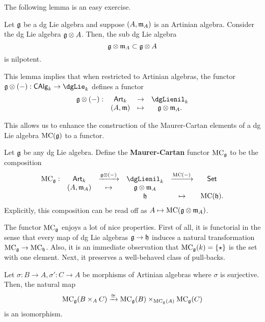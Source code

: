 \documentclass[11pt]{amsart}
\begin{document}
The following lemma is an easy exercise. 

\begin{lem}
Let $\mathfrak g$ be a dg Lie algebra and suppose $(A,{\mathfrak m}_A)$ is an Artinian algebra.
Consider the dg Lie algebra $\mathfrak g \otimes A$. 
Then, the sub dg Lie algebra
\[
\mathfrak g \otimes {\mathfrak m}_A \subset \mathfrak g \otimes A
\]
is nilpotent.
\end{lem}

This lemma implies that when restricted to Artinian algebras, the functor $\fg \tensor (-) : \CAlg_k \to \dgLie_k$ defines a functor
\[
\begin{array}{cccc}
\fg \tensor (-) : & \Art_k & \to & \dgLienil_k \\
& (A,\fm) & \mapsto & \fg \tensor \fm_A .
\end{array}
\]

This allows us to enhance the construction of the Maurer-Cartan elements of a dg Lie algebra ${\rm MC}(\mathfrak g)$ to a functor.

\begin{dfn}
Let $\mathfrak g$ be any dg Lie algebra.
Define the {\bf Maurer-Cartan} functor ${\rm MC}_\mathfrak g$ to be the composition
\[
\begin{array}{cccccccc}
\MC_\fg: & \Art_k & \xto{\fg \tensor (-)} & \dgLienil_k & \xto{\MC(-)} & \Set \\
& (A,\fm_A) & \mapsto & \fg \tensor \fm_A & & \\
& & & \fh & \mapsto & \MC(\fh) .
\end{array}
\]
Explicitly, this composition can be read off as $A \mapsto {\rm MC}(\mathfrak g \otimes {\mathfrak m}_A)$. 
\end{dfn}

The functor ${\rm MC}_\mathfrak g$ enjoys a lot of nice properties. 
First of all, it is functorial in the sense that every map of dg Lie algebras $\mathfrak g \to \mathfrak h$ induces a natural transformation ${\rm MC}_\mathfrak g \to {\rm MC}_\mathfrak h$. 
Also, it is an immediate observation that ${\rm MC}_\mathfrak g(k) = \{\star\}$ is the set with one element. 
Next, it preserves a well-behaved class of pull-backs. 

\begin{ex}
\label{ex: MC}
Let $\sigma : B \to A, \sigma' : C \to A$ be morphisms of Artinian algebras where $\sigma$ is surjective.
Then, the natural map
\[
{\rm MC}_\mathfrak g(B \times_A C) \xrightarrow{\cong} {\rm MC}_\mathfrak g(B) \times_{{\rm MC}_\mathfrak g(A)} {\rm MC}_\mathfrak g(C)
\]
is an isomorphism.
\end{ex}
\end{document}
